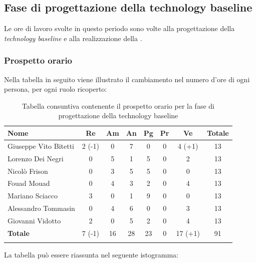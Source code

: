 		\subsection{Fase di progettazione della technology baseline}
		Le ore di lavoro svolte in questo periodo sono volte alla progettazione della \textit{technology baseline} e alla realizzazione della . 

		\subsubsection{Prospetto orario}
			Nella tabella in seguito viene illustrato il cambiamento nel numero d'ore di ogni persona, per ogni ruolo ricoperto:
			
			\begin{longtable}{|l|c|c|c|c|c|c|c|}
				\hline
				\rowcolor{lighter-grayer}
				\textbf{Nome} & \textbf{Re} & \textbf{Am} & \textbf{An} & \textbf{Pg}  & \textbf{Pr}   & \textbf{Ve} & \textbf{Totale} \\
				\hline
				\endfirsthead
				\hline
				Giuseppe Vito Bitetti & 2 (-1) & 0 & 7 & 0 & 0 & 4 (+1) & 13\\
				\hline
				\hline
				Lorenzo Dei Negri & 0 & 5 & 1 & 5 & 0 & 2 & 13\\
				\hline
				\hline
				Nicolò Frison & 0 & 3 & 5 & 5 & 0 & 0 & 13\\
				\hline
				\hline
				Fouad Mouad & 0 & 4 & 3 & 2 & 0 & 4 & 13 \\
				\hline
				\hline
				Mariano Sciacco & 3 & 0 & 1 & 9 & 0 & 0 & 13\\
				\hline
				\hline
				Alessandro Tommasin & 0 & 4 & 6 & 0 & 0 & 3  & 13\\
				\hline
				\hline
				Giovanni Vidotto & 2 & 0 & 5 & 2 & 0 & 4 & 13\\
				\hline 
				\textbf{Totale} & 7 (-1) &  16 & 28 & 23 & 0 & 17 (+1) & 91 \\
				\hline
				
				\caption{Tabella consuntiva contenente il prospetto orario per la fase di progettazione della technology baseline}
			\end{longtable}
			
			La tabella può essere riassunta nel seguente istogramma:
			
